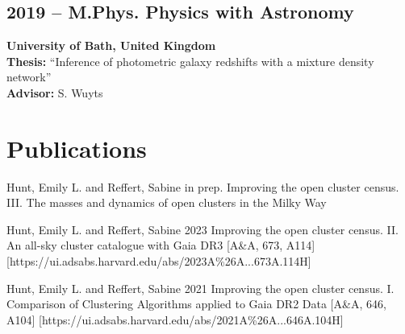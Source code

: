 \documentclass[12pt, letterpaper]{hunt-cv}
\begin{document}
\subsection*{2019 -- M.Phys. Physics with Astronomy}
\begin{addmargin}[1em]{0em}
    \textbf{University of Bath, United Kingdom}\\
    \textbf{Thesis:} ``Inference of photometric galaxy redshifts with a
    mixture density network''\\
    \textbf{Advisor:} S. Wuyts
\end{addmargin}




\section*{Publications ~ \href{\cvADSLink}{\faLink}}


\begin{etaremune}
    \item \publication
        {Hunt, Emily L. and Reffert, Sabine}
        {in prep.}
        {Improving the open cluster census. III. The masses and dynamics of open clusters in the Milky Way}
    \item \publication
        {Hunt, Emily L. and Reffert, Sabine}
        {2023}
        {Improving the open cluster census. II. An all-sky cluster catalogue with Gaia DR3}
        [A\&A, 673, A114]
        [https://ui.adsabs.harvard.edu/abs/2023A\%26A...673A.114H]
    \item \publication
        {Hunt, Emily L. and Reffert, Sabine}
        {2021}
        {Improving the open cluster census. I. Comparison of Clustering Algorithms applied to Gaia DR2 Data}
        [A\&A, 646, A104]
        [https://ui.adsabs.harvard.edu/abs/2021A\%26A...646A.104H]
\end{etaremune}
\end{document}

